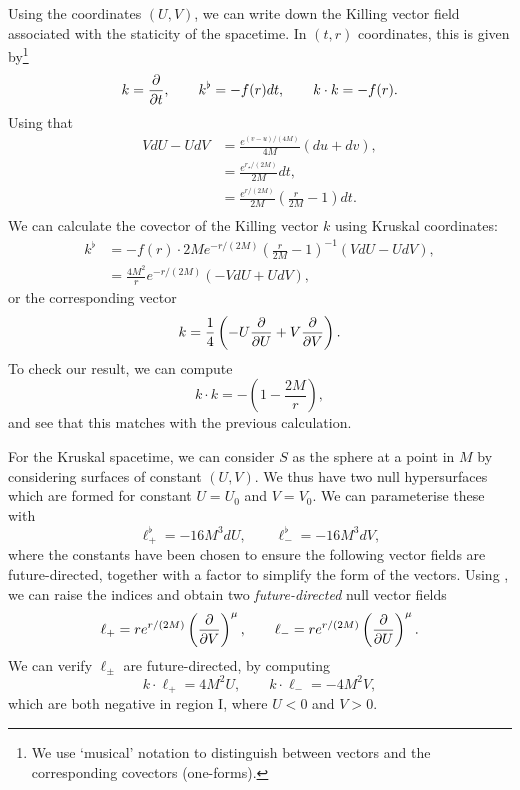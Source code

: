 Using the coordinates $(U,V)$, we can write down the Killing vector field associated with the staticity of the spacetime. In $(t,r)$ coordinates, this is given by\footnote{We use
`musical' notation to distinguish between vectors and the corresponding covectors (one-forms).}
\begin{equation*}
	k = \frac{\partial }{\partial t}, \qquad k^\flat = - f(r) dt, \qquad k \cdot k = - f(r).
\end{equation*}
Using that
\begin{equation*}
\begin{aligned}
		VdU - UdV &= \frac{e^{(v-u)/(4M)}}{4M} \left( du + dv \right), \\
		&= \frac{e^{r_\star / (2M)}}{2M} dt, \\
		&= \frac{e^{r / (2M)}}{2M} \left(\frac{r}{2M} - 1\right)  dt. \\
\end{aligned}
\end{equation*}
We can calculate the covector of the Killing vector $k$ using Kruskal coordinates:
\begin{equation*}
\begin{aligned}
	k^\flat &= -f(r) \cdot 2M e^{-r / (2M)} \left(\frac{r}{2M} - 1\right)^{-1} \left( VdU - UdV \right) ,\\
	  &= \frac{4 M^2}{r} e^{-r / (2M)} \left(-VdU + UdV \right),
\end{aligned}
\end{equation*}
or the corresponding vector
\begin{equation*}
	k = \frac{1}{4} \left( - U \frac{\partial }{\partial U} + V \frac{\partial }{\partial V} \right).
\end{equation*}
To check our result, we can compute
\begin{equation*}
	k \cdot k = - \left(1 - \frac{2M}{r} \right),
\end{equation*}
and see that this matches with the previous calculation. 

For the Kruskal spacetime, we can consider $S$ as the sphere at a point in $M$ by considering surfaces of constant $(U,V)$. We thus have two null hypersurfaces which are formed for constant $U = U_0$ and $V = V_0$. We can parameterise these with
\begin{equation*}
	\ell^\flat_{+} = -16M^3 dU, \qquad \ell^\flat_{-} = -16M^3 dV, 
\end{equation*}
where the constants have been chosen to ensure the following vector fields are future-directed, together with a factor to simplify the form of the vectors. Using , we can raise the indices and obtain two \emph{future-directed} null vector fields
\begin{equation*}
	\ell_+ = r e^{r/(2M)} \left( \frac{\partial }{\partial V} \right)^\mu, \qquad \ell_- = r e^{r/(2M)} \left( \frac{\partial }{\partial U} \right)^\mu.
\end{equation*}
We can verify $\ell_\pm$ are future-directed, by computing
\begin{equation*}
	k \cdot \ell_+ = 4 M^2 U, \qquad k \cdot \ell_- = - 4 M^2 V,
\end{equation*}
which are both negative in region I, where $U < 0$ and $V > 0$.

